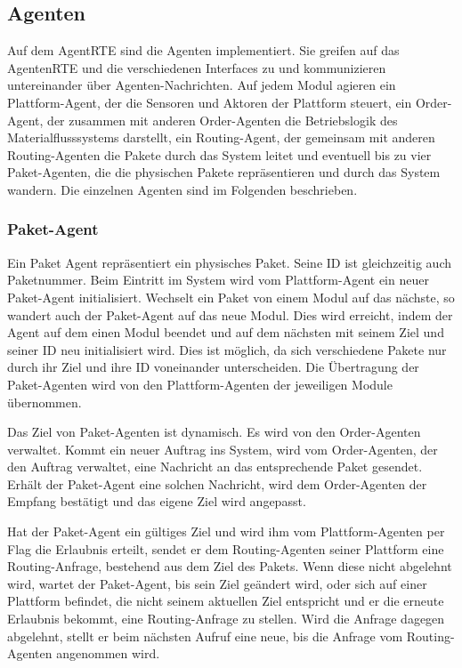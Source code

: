 \subsection{Agenten}
Auf dem AgentRTE sind die Agenten implementiert. Sie greifen auf das AgentenRTE und die verschiedenen Interfaces zu und kommunizieren untereinander über Agenten-Nachrichten. Auf jedem Modul agieren ein Plattform-Agent, der die Sensoren und Aktoren der Plattform steuert, ein Order-Agent, der zusammen mit anderen Order-Agenten die Betriebslogik des Materialflusssystems darstellt, ein Routing-Agent, der gemeinsam mit anderen Routing-Agenten die Pakete durch das System leitet und eventuell bis zu vier Paket-Agenten, die die physischen Pakete repräsentieren und durch das System wandern. Die einzelnen Agenten sind im Folgenden beschrieben.
\subsubsection{Paket-Agent}
Ein Paket Agent repräsentiert ein physisches Paket. Seine ID ist gleichzeitig auch Paketnummer. Beim Eintritt im System wird vom Plattform-Agent ein neuer Paket-Agent initialisiert. Wechselt ein Paket von einem Modul auf das nächste, so wandert auch der Paket-Agent auf das neue Modul. Dies wird erreicht, indem der Agent auf dem einen Modul beendet und auf dem nächsten mit seinem Ziel und seiner ID neu initialisiert wird. Dies ist möglich, da sich verschiedene Pakete nur durch ihr Ziel und ihre ID voneinander unterscheiden. Die Übertragung der Paket-Agenten wird von den Plattform-Agenten der jeweiligen Module übernommen.

Das Ziel von Paket-Agenten ist dynamisch. Es wird von den Order-Agenten verwaltet. Kommt ein neuer Auftrag ins System, wird vom Order-Agenten, der den Auftrag verwaltet, eine Nachricht an das entsprechende Paket gesendet. Erhält der Paket-Agent eine solchen Nachricht, wird dem Order-Agenten der Empfang bestätigt und das eigene Ziel wird angepasst.

Hat der Paket-Agent ein gültiges Ziel und wird ihm vom Plattform-Agenten per Flag die Erlaubnis erteilt, sendet er dem Routing-Agenten seiner Plattform eine Routing-Anfrage, bestehend aus dem Ziel des Pakets. Wenn diese nicht abgelehnt wird, wartet der Paket-Agent, bis sein Ziel geändert wird, oder sich auf einer Plattform befindet, die nicht seinem aktuellen Ziel entspricht und er die erneute Erlaubnis bekommt, eine Routing-Anfrage zu stellen. Wird die Anfrage dagegen abgelehnt, stellt er beim nächsten Aufruf eine neue, bis die Anfrage vom Routing-Agenten angenommen wird.

